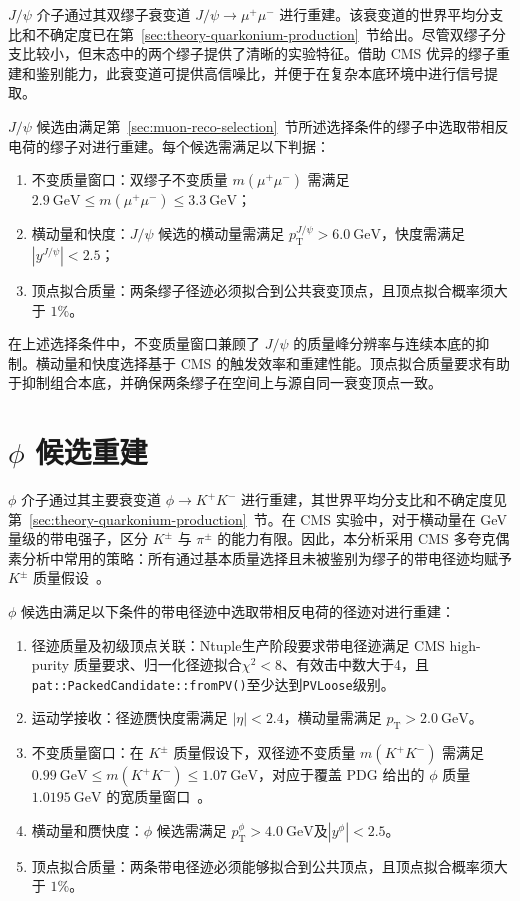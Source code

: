 $J/\psi$ 介子通过其双缪子衰变道 $J/\psi \to \mu^+\mu^-$ 进行重建。该衰变道的世界平均分支比和不确定度已在第~\ref{sec:theory-quarkonium-production}~节给出。尽管双缪子分支比较小，但末态中的两个缪子提供了清晰的实验特征。借助 CMS 优异的缪子重建和鉴别能力，此衰变道可提供高信噪比，并便于在复杂本底环境中进行信号提取。

$J/\psi$ 候选由满足第~\ref{sec:muon-reco-selection}~节所述选择条件的缪子中选取带相反电荷的缪子对进行重建。每个候选需满足以下判据：

\begin{enumerate}
  \item 不变质量窗口：双缪子不变质量 $m(\mu^+\mu^-)$ 需满足 $\SI{2.9}{\giga\eV}\leq m(\mu^+\mu^-)\leq \SI{3.3}{\giga\eV}$；
  \item 横动量和快度：$J/\psi$ 候选的横动量需满足 $p_{\mathrm T}^{J/\psi} > \SI{6.0}{\giga\eV}$，快度需满足 $|y^{J/\psi}| < 2.5$；
  \item 顶点拟合质量：两条缪子径迹必须拟合到公共衰变顶点，且顶点拟合概率须大于 $1\%$。
\end{enumerate}

在上述选择条件中，不变质量窗口兼顾了 $J/\psi$ 的质量峰分辨率与连续本底的抑制。横动量和快度选择基于 CMS 的触发效率和重建性能。顶点拟合质量要求有助于抑制组合本底，并确保两条缪子在空间上与源自同一衰变顶点一致。

\section{\texorpdfstring{$\phi$}{phi} 候选重建}
\label{sec:phi-reco}

$\phi$ 介子通过其主要衰变道 $\phi \to K^+K^-$ 进行重建，其世界平均分支比和不确定度见第~\ref{sec:theory-quarkonium-production}~节。在 CMS 实验中，对于横动量在 \si{\giga\eV} 量级的带电强子，区分 $K^\pm$ 与 $\pi^\pm$ 的能力有限。因此，本分析采用 CMS 多夸克偶素分析中常用的策略：所有通过基本质量选择且未被鉴别为缪子的带电径迹均赋予 $K^\pm$ 质量假设~\cite{CMS_TRI_JPSI}。

$\phi$ 候选由满足以下条件的带电径迹中选取带相反电荷的径迹对进行重建：

\begin{enumerate}
  \item 径迹质量及初级顶点关联：Ntuple生产阶段要求带电径迹满足 CMS high-purity 质量要求、归一化径迹拟合$\chi^2<8$、有效击中数大于4，且\texttt{pat::PackedCandidate::fromPV()}至少达到\texttt{PVLoose}级别。
  \item 运动学接收：径迹赝快度需满足 $|\eta| < 2.4$，横动量需满足 $p_{\mathrm T} > \SI{2.0}{\giga\eV}$。
  \item 不变质量窗口：在 $K^\pm$ 质量假设下，双径迹不变质量 $m(K^+K^-)$ 需满足 $\SI{0.99}{\giga\eV}\leq m(K^+K^-)\leq \SI{1.07}{\giga\eV}$，对应于覆盖 PDG 给出的 $\phi$ 质量 $\SI{1.0195}{\giga\eV}$ 的宽质量窗口~\cite{PDG2024}。
  \item 横动量和赝快度：$\phi$ 候选需满足 $p_{\mathrm T}^{\phi} > \SI{4.0}{\giga\eV}$及$|y^\phi|<2.5$。
  \item 顶点拟合质量：两条带电径迹必须能够拟合到公共顶点，且顶点拟合概率须大于 $1\%$。
\end{enumerate}

